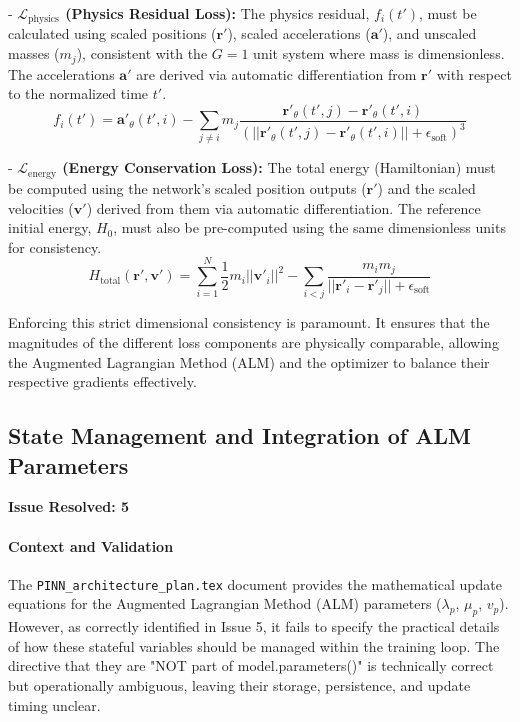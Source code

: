 - \textbf{$\mathcal{L}_{\text{physics}}$ (Physics Residual Loss):} The physics residual, $f_i(t')$, must be calculated using scaled positions ($\mathbf{r}'$), scaled accelerations ($\mathbf{a}'$), and unscaled masses ($m_j$), consistent with the $G=1$ unit system where mass is dimensionless. The accelerations $\mathbf{a}'$ are derived via automatic differentiation from $\mathbf{r}'$ with respect to the normalized time $t'$.
    \begin{equation}
        f_i(t') = \mathbf{a}'_{\theta}(t', i) - \sum_{j \neq i} m_j \frac{\mathbf{r}'_{\theta}(t', j) - \mathbf{r}'_{\theta}(t', i)}{(||\mathbf{r}'_{\theta}(t', j) - \mathbf{r}'_{\theta}(t', i)|| + \epsilon_{\text{soft}})^3}
    \end{equation}

- \textbf{$\mathcal{L}_{\text{energy}}$ (Energy Conservation Loss):} The total energy (Hamiltonian) must be computed using the network's scaled position outputs ($\mathbf{r}'$) and the scaled velocities ($\mathbf{v}'$) derived from them via automatic differentiation. The reference initial energy, $H_0$, must also be pre-computed using the same dimensionless units for consistency.
    \begin{equation}
        H_{\text{total}}(\mathbf{r}', \mathbf{v}') = \sum_{i=1}^{N} \frac{1}{2} m_i ||\mathbf{v}'_i||^2 - \sum_{i<j} \frac{m_i m_j}{||\mathbf{r}'_i - \mathbf{r}'_j|| + \epsilon_{\text{soft}}}
    \end{equation}

Enforcing this strict dimensional consistency is paramount. It ensures that the magnitudes of the different loss components are physically comparable, allowing the Augmented Lagrangian Method (ALM) and the optimizer to balance their respective gradients effectively.

\subsection{State Management and Integration of ALM Parameters}
\textbf{Issue Resolved: 5}
\paragraph{Context and Validation}
The \texttt{PINN\_architecture\_plan.tex} document provides the mathematical update equations for the Augmented Lagrangian Method (ALM) parameters ($\lambda_p$, $\mu_p$, $v_p$). However, as correctly identified in Issue 5, it fails to specify the practical details of how these stateful variables should be managed within the training loop. The directive that they are "NOT part of model.parameters()" is technically correct but operationally ambiguous, leaving their storage, persistence, and update timing unclear.

